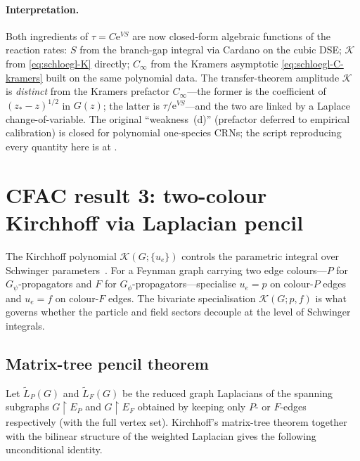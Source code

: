 \documentclass[11pt,a4paper]{article}
\newcommand{\ee}{\mathrm{e}}
\theoremstyle{plain}
\begin{document}
\paragraph{Interpretation.}
Both ingredients of $\tau = C \ee^{VS}$ are now closed-form
algebraic functions of the reaction rates: $S$ from the branch-gap
integral via Cardano on the cubic DSE; $\mathcal K$ from
\eqref{eq:schloegl-K} directly; $C_\infty$ from the Kramers
asymptotic \eqref{eq:schloegl-C-kramers} built on the same
polynomial data.  The transfer-theorem amplitude $\mathcal K$ is
\emph{distinct} from the Kramers prefactor $C_\infty$---the former
is the coefficient of $(z_* - z)^{1/2}$ in $G(z)$; the latter is
$\tau/\ee^{VS}$---and the two are linked by a Laplace
change-of-variable.  The original ``weakness~(d)'' (prefactor
deferred to empirical calibration) is closed for polynomial
one-species CRNs; the script reproducing every quantity here is at
.

\section{CFAC result 3: two-colour Kirchhoff via Laplacian pencil}
\label{sec:kirchhoff}

The Kirchhoff polynomial $\mathcal{K}(G;\{u_e\})$ controls the
parametric integral over Schwinger parameters~\cite{BognerWeinzierl}.
For a Feynman graph carrying two edge colours---$P$ for
$G_\psi$-propagators and $F$ for $G_\phi$-propagators---specialise
$u_e = p$ on colour-$P$ edges and $u_e = f$ on colour-$F$ edges.
The bivariate specialisation $\mathcal{K}(G; p, f)$ is what governs
whether the particle and field sectors decouple at the level of
Schwinger integrals.

\subsection{Matrix-tree pencil theorem}

Let $\widetilde L_P(G)$ and $\widetilde L_F(G)$ be the reduced graph
Laplacians of the spanning subgraphs $G\!\upharpoonright\!E_P$ and
$G\!\upharpoonright\!E_F$ obtained by keeping only $P$- or $F$-edges
respectively (with the full vertex set).  Kirchhoff's matrix-tree
theorem together with the bilinear structure of the weighted
Laplacian gives the following unconditional identity.
\end{document}
